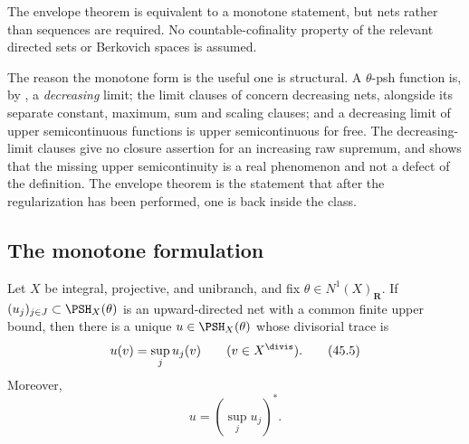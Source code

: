 The envelope theorem is equivalent to a monotone statement, but nets rather
than sequences are required.
No countable-cofinality property of the relevant directed sets or Berkovich
spaces is assumed.

The reason the monotone form is the useful one is structural.  A
$\theta$-psh function is, by , a \emph{decreasing} limit;
the limit clauses of  concern decreasing
nets, alongside its separate constant, maximum, sum and scaling clauses; and a decreasing
limit of upper semicontinuous functions is upper semicontinuous for free.
The decreasing-limit clauses give no closure assertion for an increasing
raw supremum, and  shows that the missing upper
semicontinuity is a real phenomenon and not a defect of the definition.  The
envelope theorem is the statement that after the regularization has been
performed, one is back inside the class.

\subsection{The monotone formulation}
\label{sec:ch45-monotone-form}

\begin{theorem}\label{thm:bj-final-increasing-nets}
Let $X$ be integral, projective, and unibranch, and fix
$\theta\in N^1(X)_{\mathbf R}$.
If $(u_j)_{j\in J}\subset\PSH_X(\theta)$ is an upward-directed net with a
common finite upper bound, then there is a unique
$u\in\PSH_X(\theta)$ whose divisorial trace is
\[
                         u(v)=\sup_j u_j(v)
               \qquad(v\in X^{\divis}).
\tag{45.5}\label{eq:bj-final-directed-trace}
\]
Moreover,
\[
                         u=\left(\sup_j u_j\right)^*.
\tag{45.6}\label{eq:bj-final-directed-envelope}
\]
\end{theorem}

